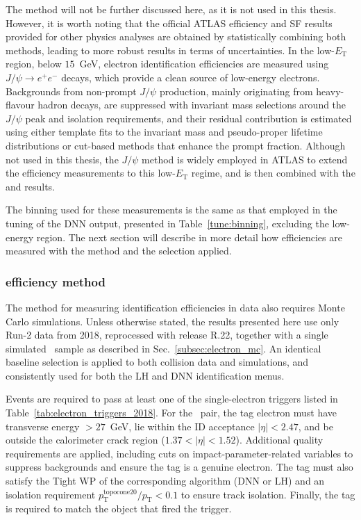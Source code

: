 The \ziso method will not be further discussed here, as it is not used in this thesis. However, it is worth noting that the official ATLAS efficiency and SF results provided for other physics analyses are obtained by statistically combining both methods, leading to more robust results in terms of uncertainties. In the low-$E_{\mathrm{T}}$ region, below $15$~GeV, electron identification efficiencies are measured using $J/\psi \to e^+e^-$ decays, which provide a clean source of low-energy electrons. Backgrounds from non-prompt $J/\psi$ production, mainly originating from heavy-flavour hadron decays, are suppressed with invariant mass selections around the $J/\psi$ peak and isolation requirements, and their residual contribution is estimated using either template fits to the invariant mass and pseudo-proper lifetime distributions or cut-based methods that enhance the prompt fraction. Although not used in this thesis, the $J/\psi$ method is widely employed in ATLAS to extend the efficiency measurements to this low-$E_{\mathrm{T}}$ regime, and is then combined with the \zmass and \ziso results.

The binning used for these measurements is the same as that employed in the tuning of the DNN output, presented in Table~\ref{tune:binning}, excluding the low-energy region. The next section will describe in more detail how efficiencies are measured with the \zmass method and the selection applied.

\subsubsection{\zmass efficiency method}

The \zmass method for measuring identification efficiencies in data also requires Monte Carlo simulations. Unless otherwise stated, the results presented here use only Run-2 data from 2018, reprocessed with release R.22, together with a single simulated \zee\ sample as described in Sec.~\ref{subsec:electron_mc}. An identical baseline selection is applied to both collision data and simulations, and consistently used for both the LH and DNN identification menus.

Events are required to pass at least one of the single-electron triggers listed in Table~\ref{tab:electron_triggers_2018}. For the \tp\ pair, the tag electron must have transverse energy \et$>27$~GeV, lie within the ID acceptance $|\eta|<2.47$, and be outside the calorimeter crack region ($1.37<|\eta|<1.52$). Additional quality requirements are applied, including cuts on impact-parameter-related variables to suppress backgrounds and ensure the tag is a genuine electron. The tag must also satisfy the Tight WP of the corresponding algorithm (DNN or LH) and an isolation requirement $p_{\mathrm{T}}^{\mathrm{topocone20}}/p_{\mathrm{T}}<0.1$ to ensure track isolation. Finally, the tag is required to match the object that fired the trigger.

